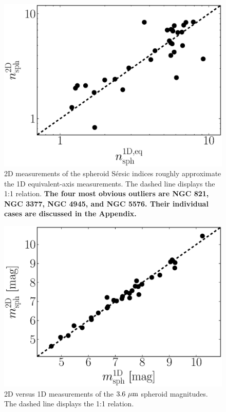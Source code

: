 \documentclass[preprint2]{emulateapj}
\begin{document}
\begin{figure}[h]
\begin{center}
\includegraphics[width=\columnwidth]{images/comparison_n.eps} 
\caption{2D measurements of the spheroid S\'ersic indices roughly approximate the 1D equivalent-axis measurements. 
The dashed line displays the 1:1 relation.
{\bf The four most obvious outliers are NGC 821, NGC 3377, NGC 4945, and NGC 5576. 
Their individual cases are discussed in the Appendix. }}
\label{fig:n1d2d}
\end{center}
\end{figure}

\begin{figure}[h]
\begin{center}
\includegraphics[width=\columnwidth]{images/comparison_mag.eps} 
\caption{2D versus 1D measurements of the $3.6~\rm \mu m$ spheroid magnitudes. The dashed line displays the 1:1 relation.}
\label{fig:mag1d2d}
\end{center}
\end{figure}
\end{document}
